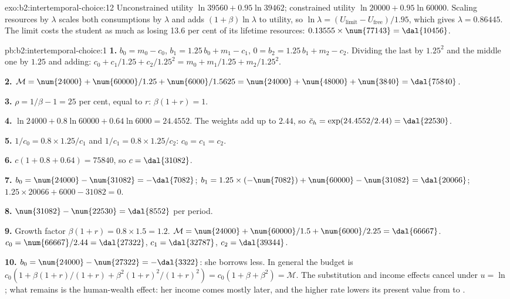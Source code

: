 \begin{solution}{exo:b2:intertemporal-choice:12}
Unconstrained utility $\ln\num{39560} + 0.95\ln\num{39462}$; constrained utility $\ln\num{20000} +
0.95\ln\num{60000}$. Scaling resources by $\lambda$ scales both consumptions by $\lambda$ and adds
$(1 + \beta)\ln\lambda$ to utility, so $\ln\lambda = (U_{\text{limit}} - U_{\text{free}})/1.95$, which
gives $\lambda = 0.86445$. The limit costs the student as much as losing 13.6 per cent of its lifetime
resources: $0.13555 \times \num{77143} = \dal{10456}$.
\end{solution}

\begin{solution}{pb:b2:intertemporal-choice:1}
\textbf{1.} $b_0 = m_0 - c_0$, $b_1 = 1.25\,b_0 + m_1 - c_1$, $0 = b_2 = 1.25\,b_1 + m_2 - c_2$.
Dividing the last by $1.25^2$ and the middle one by $1.25$ and adding: $c_0 + c_1/1.25 + c_2/1.25^2 =
m_0 + m_1/1.25 + m_2/1.25^2$.

\textbf{2.} $\mathcal{M} = \num{24000} + \num{60000}/1.25 + \num{6000}/1.5625 = \num{24000} +
\num{48000} + \num{3840} = \dal{75840}$.

\textbf{3.} $\rho = 1/\beta - 1 = 25$ per cent, equal to $r$: $\beta(1 + r) = 1$.

\textbf{4.} $\ln\num{24000} + 0.8\ln\num{60000} + 0.64\ln\num{6000} = 24.4552$. The weights add up to
$2.44$, so $\bar c_h = \exp(24.4552/2.44) = \dal{22530}$.

\textbf{5.} $1/c_0 = 0.8 \times 1.25/c_1$ and $1/c_1 = 0.8 \times 1.25/c_2$: $c_0 = c_1 = c_2$.

\textbf{6.} $c(1 + 0.8 + 0.64) = \num{75840}$, so $c = \dal{31082}$.

\textbf{7.} $b_0 = \num{24000} - \num{31082} = -\dal{7082}$; $b_1 = 1.25 \times (-\num{7082}) +
\num{60000} - \num{31082} = \dal{20066}$; $1.25 \times \num{20066} + \num{6000} - \num{31082} = 0$.

\textbf{8.} $\num{31082} - \num{22530} = \dal{8552}$ per period.

\textbf{9.} Growth factor $\beta(1 + r) = 0.8 \times 1.5 = 1.2$. $\mathcal{M} = \num{24000} +
\num{60000}/1.5 + \num{6000}/2.25 = \dal{66667}$. $c_0 = \num{66667}/2.44 = \dal{27322}$, $c_1 =
\dal{32787}$, $c_2 = \dal{39344}$.

\textbf{10.} $b_0 = \num{24000} - \num{27322} = -\dal{3322}$: she borrows less. In general the budget is
$c_0(1 + \beta(1 + r)/(1 + r) + \beta^2(1 + r)^2/(1 + r)^2) = c_0(1 + \beta + \beta^2) = \mathcal{M}$.
The substitution and income effects cancel under $u = \ln$; what remains is the human-wealth effect:
her income comes mostly later, and the higher rate lowers its present value from  to
.


\end{solution}

